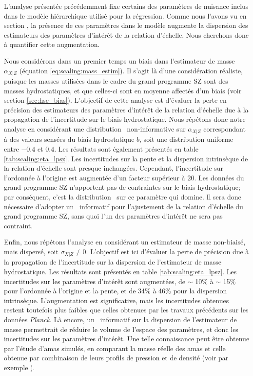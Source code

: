 L'analyse présentée précédemment fixe certains des paramètres de nuisance inclus dans le modèle hiérarchique utilisé pour la régression.
Comme nous l'avons vu en section , la présence de ces paramètres dans le modèle augmente la dispersion des estimateurs des paramètres d'intérêt de la relation d'échelle.
Nous cherchons donc à quantifier cette augmentation.

Nous considérons dans un premier temps un biais dans l'estimateur de masse $\alpha_{X|Z}$ (équation \ref{eq:scaling:mass_estim}).
Il s'agit là d'une considération réaliste, puisque les masses utilisées dans le cadre du grand programme SZ sont des masses hydrostatiques, et que celles-ci sont en moyenne affectés d'un biais (voir section \ref{sec:hse_bias}).
L'objectif de cette analyse est d'évaluer la perte en précision des estimateurs des paramètres d'intérêt de la relation d'échelle due à la propagation de l'incertitude sur le biais hydrostatique.
Nous répétons donc notre analyse en considérant une distribution \prior\ non-informative sur $\alpha_{X|Z}$ correspondant à des valeurs sensées du biais hydrostatique $b$, soit une distribution uniforme entre $-0.4$ et $0.4$.
Les résultats sont également présentés en table \ref{tab:scaling:eta_lpsz}.
Les incertitudes sur la pente et la dispersion intrinsèque de la relation d'échelle sont presque inchangées.
Cependant, l'incertitude sur l'ordonnée à l'origine est augmentée d'un facteur supérieur à 20.
Les données du grand programme SZ n'apportent pas de contraintes sur le biais hydrostatique; par conséquent, c'est la distribution \prior\ sur ce paramètre qui domine.
Il sera donc nécessaire d'adopter un \prior\ informatif pour l'ajustement de la relation d'échelle du grand programme SZ, sans quoi l'un des paramètres d'intérêt ne sera pas contraint.

Enfin, nous répétons l'analyse en considérant un estimateur de masse non-biaisé, mais dispersé, soit $\sigma_{X|Z} \neq 0$.
L'objectif est ici d'évaluer la perte de précision due à la propagation de l'incertitude sur la dispersion de l'estimateur de masse hydrostatique.
Les résultats sont présentés en table \ref{tab:scaling:eta_lpsz}.
Les incertitudes sur les paramètres d'intérêt sont augmentées, de $\sim$ 10\% à $\sim$ 15\% pour l'ordonnée à l'origine et la pente, et de 34\% à 46\% pour la dispersion intrinsèque.
L'augmentation est significative, mais les incertitudes obtenues restent toutefois plus faibles que celles obtenues par les travaux précédents sur les données \textit{Planck}.
Là encore, un \prior\ informatif sur la dispersion de l'estimateur de masse permettrait de réduire le volume de l'espace des paramètres, et donc les incertitudes sur les paramètres d'intérêt.
Une telle connaissance peut être obtenue par l'étude d'amas simulés, en comparant la masse réelle des amas et celle obtenue par combinaison de leurs profils de pression et de densité (voir par exemple \cite{gianfagna_exploring_2021}).

